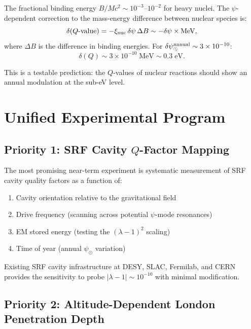 \documentclass[aps,prb,twocolumn,superscriptaddress,floatfix,nofootinbib,longbibliography]{revtex4-2}
\begin{document}
The fractional binding energy $B/Mc^2 \sim 10^{-3}$--$10^{-2}$ for
heavy nuclei.  The $\psi$-dependent correction to the mass-energy
difference between nuclear species is:
\begin{equation}
\delta(Q\text{-value}) = -\xi_{\rm nuc}\,\delta\psi\,\Delta B
\sim -\delta\psi \times \text{MeV},
\label{eq:Q-value}
\end{equation}
where $\Delta B$ is the difference in binding energies.  For
$\delta\psi_\odot^{\rm annual} \sim 3\times 10^{-10}$:
\begin{equation}
\delta(Q) \sim 3\times 10^{-10}\;\text{MeV} \sim 0.3\;\text{eV}.
\label{eq:Q-annual}
\end{equation}

This is a testable prediction: the $Q$-values of nuclear reactions should
show an annual modulation at the sub-eV level.

\section{Unified Experimental Program}\label{sec:experiment}

\subsection{Priority 1: SRF Cavity $Q$-Factor Mapping}

The most promising near-term experiment is systematic measurement of SRF
cavity quality factors as a function of:
\begin{enumerate}[nosep]
\item Cavity orientation relative to the gravitational field
\item Drive frequency (scanning across potential $\psi$-mode resonances)
\item EM stored energy (testing the $(\lambda-1)^2$ scaling)
\item Time of year (annual $\psi_\odot$ variation)
\end{enumerate}

Existing SRF cavity infrastructure at DESY, SLAC, Fermilab, and CERN
provides the sensitivity to probe $|\lambda - 1| \sim 10^{-10}$ with
minimal modification.

\subsection{Priority 2: Altitude-Dependent London Penetration Depth}
\end{document}
